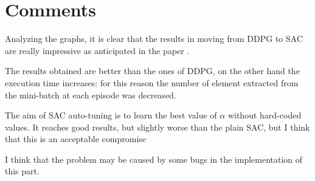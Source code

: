\documentclass[a4paper, 11pt]{article}
\begin{document}
	\newpage
	\section{Comments} \label{final}
	
	Analyzing the graphs, it is clear that the results in moving from DDPG to SAC are really impressive as anticipated in the paper \cite{haarnoja2018alg}.
	
	The results obtained are better than the ones of DDPG, on the other hand the execution time increases: for this reason the number of element extracted from the mini-batch at each episode was decreased.

	The aim of SAC auto-tuning is to learn the best value of $\alpha$ without hard-coded values. It reaches good results, but slightly worse than the plain SAC, but I think that this is an acceptable compromise
	
	I think that the problem may be caused by some bugs in the implementation of this part.
		
\end{document}
